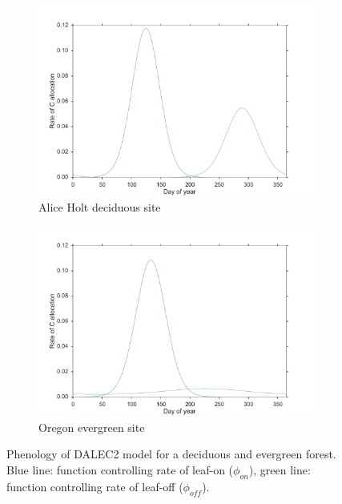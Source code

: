 \begin{figure}[ht]
    \centering
    \begin{subfigure}[b]{0.45\textwidth}
        \includegraphics[width=\textwidth]{chapter/chapter5/ah_pheno.pdf}
        \caption{Alice Holt deciduous site}
        \label{chap5:fig:ah_pheno}
    \end{subfigure}%
    \begin{subfigure}[b]{0.45\textwidth}
        \includegraphics[width=\textwidth]{chapter/chapter5/oregon_pheno.pdf}
        \caption{Oregon evergreen site}
        \label{chap5:fig:oregon_pheno}
    \end{subfigure}
    \caption{Phenology of DALEC2 model for a deciduous and evergreen forest. Blue line: function controlling rate of leaf-on (\(\phi_{on}\)), green line: function controlling rate of leaf-off (\(\phi_{off}\)).}
    \label{chap5:fig:D2_pheno}
\end{figure}

